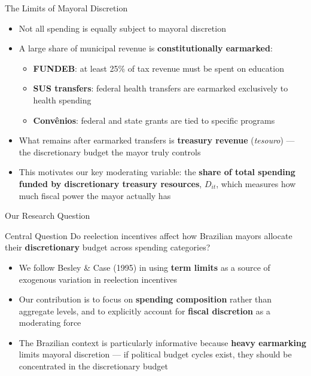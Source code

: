 \documentclass{beamer}
\begin{document}
\begin{frame}{The Limits of Mayoral Discretion}
\begin{itemize}
    \item Not all spending is equally subject to mayoral discretion
    \vspace{0.5em}
    \item A large share of municipal revenue is \textbf{constitutionally earmarked}:
    \vspace{0.5em}
    \begin{itemize}
        \item \textbf{FUNDEB}: at least 25\% of tax revenue must be spent on education
        \item \textbf{SUS transfers}: federal health transfers are earmarked exclusively to health spending
        \item \textbf{Convênios}: federal and state grants are tied to specific programs
    \end{itemize}
    \vspace{0.5em}
    \item What remains after earmarked transfers is \textbf{treasury revenue} (\textit{tesouro}) --- the discretionary budget the mayor truly controls
    \vspace{0.5em}
    \item This motivates our key moderating variable: the \textbf{share of total spending funded by discretionary treasury resources}, $D_{it}$, which measures how much fiscal power the mayor actually has
\end{itemize}
\end{frame}

\begin{frame}{Our Research Question}
\begin{block}{Central Question}
Do reelection incentives affect how Brazilian mayors allocate their \textbf{discretionary} budget across spending categories?
\end{block}
\vspace{1em}
\begin{itemize}
    \item We follow Besley \& Case (1995) in using \textbf{term limits} as a source of exogenous variation in reelection incentives
    \vspace{0.5em}
    \item Our contribution is to focus on \textbf{spending composition} rather than aggregate levels, and to explicitly account for \textbf{fiscal discretion} as a moderating force
    \vspace{0.5em}
    \item The Brazilian context is particularly informative because \textbf{heavy earmarking} limits mayoral discretion --- if political budget cycles exist, they should be concentrated in the discretionary budget
\end{itemize}
\end{frame}
\end{document}
